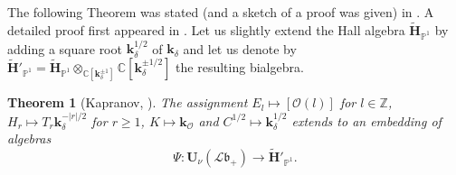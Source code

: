\documentclass[a4paper,10pt]{amsart}
\def\Z{\mathbb{Z}}
\def\H{\mathbf{H}}
\def\U{\mathbf{U}}
\def\C{\mathbb{C}}
\def\O{\mathcal{O}}
\def\bo{\mathfrak{b}}
\newtheorem{theo}{\bf{Theorem}}[section]
\numberwithin{equation}{section}
\begin{document}
\vspace{.1in}

The following Theorem was stated (and a sketch of a proof was given) in \cite{Kap1}. A detailed proof first appeared in \cite{BK}. Let us slightly extend the Hall
algebra $\widetilde{\H}_{\mathbb{P}^1}$ by adding a square root $\mathbf{k}_{\delta}^{1/2}$ of $\mathbf{k}_{\delta}$ and let us  denote by $\widetilde{\H}'_{\mathbb{P}^1}=\widetilde{\H}_{\mathbb{P}^1} \otimes_{\C[\mathbf{k}_{\delta}^{\pm 1}]} \C[\mathbf{k}_{\delta}^{\pm 1/2}]$ the resulting bialgebra.

\vspace{.1in}

\begin{theo}[Kapranov, \cite{Kap1}]\label{T:Kap} The assignment $E_l \mapsto [\O(l)]$ for $l \in \Z$, $H_r \mapsto T_r\mathbf{k}_{\delta}^{-|r|/2}$ for $r \geq 1$, $K \mapsto \mathbf{k}_{\O}$ and $C^{1/2} \mapsto \mathbf{k}_{\delta}^{1/2}$ extends to an embedding of algebras $$\Psi:\U_{\nu}(\mathcal{L}\bo_+) \to \widetilde{\H}'_{\mathbb{P}^1}.$$
\end{theo}
\noindent
\end{document}
